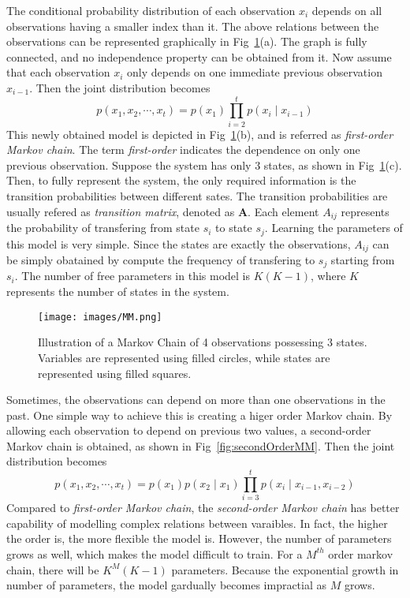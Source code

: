 The conditional probability distribution of each observation \(x_i\) depends on all observations having a smaller index than it. The above relations between the observations can be represented graphically in Fig~\ref{fig:MM}(a). The graph is fully connected, and no independence property can be obtained from it. Now assume that each observation \(x_i\) only depends on one immediate previous observation \(x_{i-1}\). Then the joint distribution becomes 
\begin{equation}
	p(x_1, x_2, \cdots, x_t) = p(x_1)\prod_{i = 2}^{t} p(x_i \mid x_{i-1})
\end{equation}
This newly obtained model is depicted in Fig~\ref{fig:MM}(b), and is referred as \textit{first-order Markov chain}. The term \textit{first-order} indicates the dependence on only one previous observation. Suppose the system has only 3 states, as shown in Fig~\ref{fig:MM}(c). Then, to fully represent the system, the only required information is the transition probabilities between different sates. The transition probabilities are usually refered as \textit{transition matrix}, denoted as \(\mathbf{A}\). Each element \(A_{ij}\) represents the probability of transfering from state \(s_i\) to state \(s_j\). Learning the parameters of this model is very simple. Since the states are exactly the observations, \(A_{ij}\) can be simply obatained by compute the frequency of transfering to \(s_j\) starting from \(s_i\). The number of free parameters in this model is \(K(K-1)\), where \(K\) represents the number of states in the system.

\begin{figure}[ht]
	\begin{center}
		\texttt{[image: images/MM.png]}
		\caption{Illustration of a Markov Chain of 4 observations possessing 3 states. Variables are represented using filled circles, while states are represented using filled squares.}
		\label{fig:MM}
	\end{center}
\end{figure}

Sometimes, the observations can depend on more than one observations in the past. One simple way to achieve this is creating a higer order Markov chain. By allowing each observation to depend on previous two values, a second-order Markov chain is obtained, as shown in Fig~\ref{fig:secondOrderMM}. Then the joint distribution becomes
\begin{equation}
	p(x_1, x_2, \cdots, x_t) = p(x_1)p(x_2 \mid x_1)\prod_{i = 3}^{t} p(x_i \mid x_{i-1}, x_{i-2})
\end{equation}
Compared to \textit{first-order Markov chain}, the \textit{second-order Markov chain} has better capability of modelling complex relations between varaibles. In fact, the higher the order is, the more flexible the model is. However, the number of parameters grows as well, which makes the model difficult to train. For a \(M^{th}\) order markov chain, there will be \(K^{M}(K-1)\) parameters. Because the exponential growth in number of parameters, the model gardually becomes impractial as \(M\) grows. 

